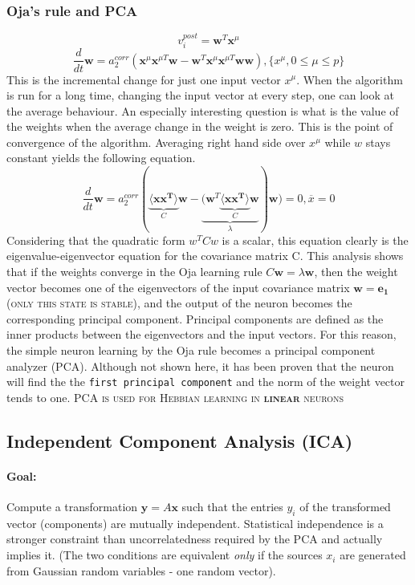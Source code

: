 \documentclass[11pt]{article}
\begin{document}
\subsubsection{Oja's rule and PCA}
\[
v_i^{post}=\mathbf{w}^T\mathbf{x}^\mu
\]
\[
\frac{d}{dt}\mathbf{w}=a_2^{corr}(\mathbf{x}^\mu \mathbf{x}^{\mu T}\mathbf{w}-\mathbf{w}^T\mathbf{x}^\mu \mathbf{x}^{\mu T}\mathbf{w}\mathbf{w}), \{x^\mu, 0 \leq \mu \leq p\}
\]
This is the incremental change for just one input vector $x^\mu$. When the algorithm is run for a long time, changing the input vector at every step, one can look at the average behaviour. An especially interesting question is what is the value of the weights when the average change in the weight is zero. This is the point of convergence of the algorithm. Averaging right hand side over $x^\mu$ while $w$ stays constant yields the following equation.
\[
\frac{d}{dt}\mathbf{w}=a_2^{corr}(\underbrace{\langle \mathbf{x}\mathbf{x^T} \rangle}_{C} \mathbf{w}-\underbrace{(\mathbf{w}^T\underbrace{\langle \mathbf{x}\mathbf{x^T} \rangle}_{C} \mathbf{w}}_{\lambda})\mathbf{w})=0, \overline{x}=0
\]
Considering that the quadratic form $w^TCw$ is a scalar, this equation clearly is the eigenvalue-eigenvector equation for the covariance matrix C. This analysis shows that if the weights converge in the Oja learning rule $C\mathbf{w}=\lambda\mathbf{w}$, then the weight vector becomes one of the eigenvectors of the input covariance matrix $\mathbf{w}=\mathbf{e_1}$ (\textsc{only this state is stable}), and the output of the neuron becomes the corresponding principal component. Principal components are defined as the inner products between the eigenvectors and the input vectors. For this reason, the simple neuron learning by the Oja rule becomes a principal component analyzer (PCA).
Although not shown here, it has been proven that the neuron will find the the \texttt{first principal component} and the norm of the weight vector tends to one.
\textsc{PCA is used for Hebbian learning in \textbf{linear} neurons}

\subsection{Independent Component Analysis (ICA)}

\paragraph{Goal:} Compute a transformation $\mathbf{y}=A\mathbf{x}$ such that the entries $y_i$ of the transformed vector (components) are mutually independent. Statistical independence is a stronger constraint than uncorrelatedness required by the PCA and actually implies it. (The two conditions are equivalent \textit{only} if the sources $x_i$ are generated from Gaussian random variables - one random vector). 
\end{document}
